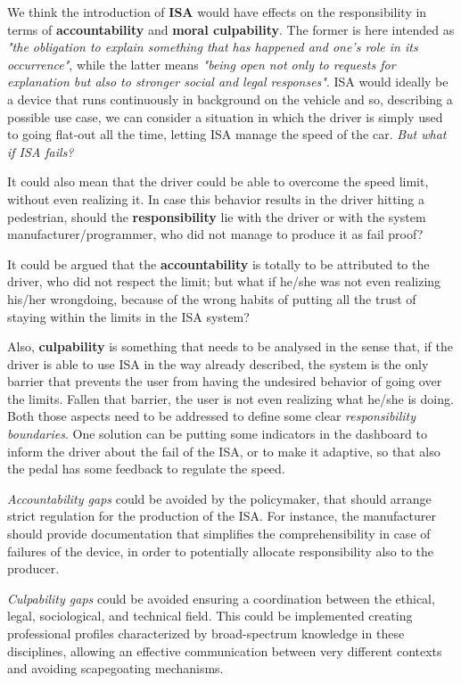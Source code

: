 We think the introduction of \textbf{ISA} would have effects on the responsibility in terms of \textbf{accountability} and \textbf{moral culpability}. The former is here intended as \textit{"the obligation to explain something that has happened and one's role in its occurrence"}, while the latter means \textit{"being open not only to requests for explanation but also to stronger social and legal responses"}. ISA would ideally be a device that runs continuously in background on the vehicle and so, describing a possible use case, we can consider a situation in which the driver is simply used to going flat-out all the time, letting ISA manage the speed of the car. \textit{But what if ISA fails?}

It could also mean that the driver could be able to overcome the speed limit, without even realizing it. In case this behavior results in the driver hitting a pedestrian, should the \textbf{responsibility} lie with the driver or with the system manufacturer/programmer, who did not manage to produce it as fail proof?

It could be argued that the \textbf{accountability} is totally to be attributed to the driver, who did not respect the limit; but what if he/she was not even realizing his/her wrongdoing, because of the wrong habits of putting all the trust of staying within the limits in the ISA system?

Also, \textbf{culpability} is something that needs to be analysed in the sense that, if the driver is able to use ISA in the way already described, the system is the only barrier that prevents the user from having the undesired behavior of going over the limits. Fallen that barrier, the user is not even realizing what he/she is doing. Both those aspects need to be addressed to define some clear \textit{responsibility boundaries}. One solution can be putting some indicators in the dashboard to inform the driver about the fail of the ISA, or to make it adaptive, so that also the pedal has some feedback to regulate the speed.

\textit{Accountability gaps} could be avoided by the policymaker, that should arrange strict regulation for the production of the ISA. For instance, the manufacturer should provide documentation that simplifies the comprehensibility in case of failures of the device, in order to potentially allocate responsibility also to the producer.

\textit{Culpability gaps} could be avoided ensuring a coordination between the ethical, legal, sociological, and technical field. This could be implemented creating professional profiles characterized by broad-spectrum knowledge in these disciplines, allowing an effective communication between very different contexts and avoiding scapegoating mechanisms.

